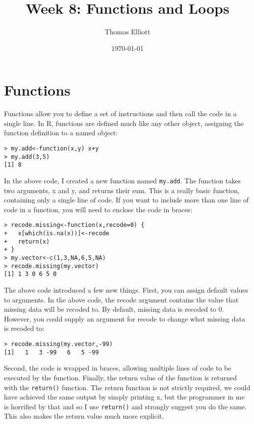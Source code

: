\documentclass[12pt, oneside]{amsart}   	%
\title{Week 8: Functions and Loops}
\author{Thomas Elliott}
\date{\today}							%
\begin{document}
\maketitle


\section{Functions}

Functions allow you to define a set of instructions and then call the code in a single line. In R, functions are defined much like any other object, assigning the function definition to a named object:

\begin{verbatim}
> my.add<-function(x,y) x+y
> my.add(3,5)
[1] 8
\end{verbatim}

In the above code, I created a new function named \texttt{my.add}. The function takes two arguments, x and y, and returns their sum. This is a really basic function, containing only a single line of code. If you want to include more than one line of code in a function, you will need to enclose the code in braces:

\begin{verbatim}
> recode.missing<-function(x,recode=0) {
+   x[which(is.na(x))]<-recode
+   return(x)
+ }
> my.vector<-c(1,3,NA,6,5,NA)
> recode.missing(my.vector)
[1] 1 3 0 6 5 0
\end{verbatim}

The above code introduced a few new things. First, you can assign default values to arguments. In the above code, the recode argument contains the value that missing data will be recoded to. By default, missing data is recoded to 0. However, you could supply an argument for recode to change what missing data is recoded to:

\begin{verbatim}
> recode.missing(my.vector,-99)
[1]   1   3 -99   6   5 -99
\end{verbatim}

Second, the code is wrapped in braces, allowing multiple lines of code to be executed by the function. Finally, the return value of the function is returned with the \texttt{return()} function. The return function is not strictly required, we could have achieved the same output by simply printing x, but the programmer in me is horrified by that and so I use \texttt{return()} and strongly suggest you do the same. This also makes the return value much more explicit.
\end{document}
